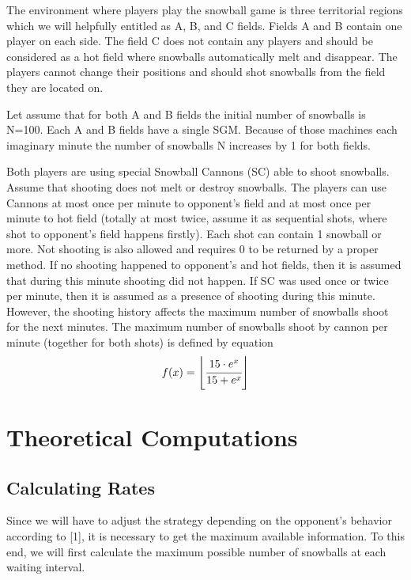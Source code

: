 \documentclass[conference]{IEEEtran}
\begin{document}

The environment where players play the snowball game is three territorial regions which we will helpfully entitled as A, B, and C fields. Fields A and B contain one player on each side. The field C does not contain any players and should be considered as a hot field where snowballs automatically melt and disappear. The players cannot change their positions and should shot snowballs from the field they are located on. 

Let assume that for both A and B fields the initial number of snowballs is N=100. Each A and B fields have a single SGM. Because of those machines each imaginary minute the number of snowballs N increases by 1 for both fields.

Both players are using special Snowball Cannons (SC) able to shoot snowballs. Assume that shooting does not melt or destroy snowballs. The players can use Cannons at most once per minute to opponent’s field and at most once per minute to hot field (totally at most twice, assume it as sequential shots, where shot to opponent’s field happens firstly). Each shot can contain 1 snowball or more. Not shooting is also allowed and requires 0 to be returned by a proper method. If no shooting happened to opponent’s and hot fields, then it is assumed that during this minute shooting did not happen. If SC was used once or twice per minute, then it is assumed as a presence of shooting during this minute. However, the shooting history affects the maximum number of snowballs shoot for the next minutes. The maximum number of snowballs shoot by cannon per minute (together for both shots) is defined by equation
\begin{equation}
f(x) = \left \lfloor \cfrac{15 \cdot e^x}{15 + e^x} \right \rfloor\label{eq1}
\end{equation}

\section{Theoretical Computations}
\subsection{Calculating Rates}
Since we will have to adjust the strategy depending on the opponent's behavior according to [1], it is necessary to get the maximum available information. To this end, we will first calculate the maximum possible number of snowballs at each waiting interval.
\end{document}
